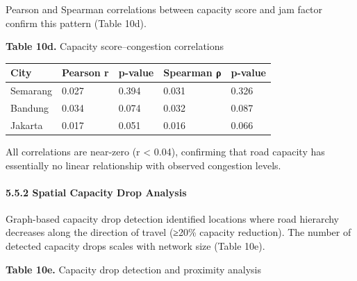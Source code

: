 Pearson and Spearman correlations between capacity score and jam factor confirm this pattern (Table 10d).

\textbf{Table 10d.} Capacity score--congestion correlations

\begin{longtable}[]{@{}lllll@{}}
\toprule\noalign{}
City & Pearson r & p-value & Spearman ρ & p-value \\
\midrule\noalign{}
\endhead
\bottomrule\noalign{}
\endlastfoot
Semarang & 0.027 & 0.394 & 0.031 & 0.326 \\
Bandung & 0.034 & 0.074 & 0.032 & 0.087 \\
Jakarta & 0.017 & 0.051 & 0.016 & 0.066 \\
\end{longtable}

All correlations are near-zero (r \textless{} 0.04), confirming that road capacity has essentially no linear relationship with observed congestion levels.

\paragraph{5.5.2 Spatial Capacity Drop Analysis}\label{spatial-capacity-drop-analysis}

Graph-based capacity drop detection identified locations where road hierarchy decreases along the direction of travel (≥20\% capacity reduction). The number of detected capacity drops scales with network size (Table 10e).

\textbf{Table 10e.} Capacity drop detection and proximity analysis

